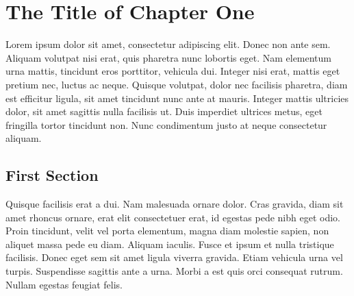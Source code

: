 \chapter{The Title of Chapter One}

Lorem ipsum dolor sit amet, consectetur adipiscing elit. Donec non ante sem. Aliquam volutpat nisi erat, quis pharetra nunc lobortis eget. Nam elementum urna mattis, tincidunt eros porttitor, vehicula dui. Integer nisi erat, mattis eget pretium nec, luctus ac neque. Quisque volutpat, dolor nec facilisis pharetra, diam est efficitur ligula, sit amet tincidunt nunc ante at mauris. Integer mattis ultricies dolor, sit amet sagittis nulla facilisis ut. Duis imperdiet ultrices metus, eget fringilla tortor tincidunt non. Nunc condimentum justo at neque consectetur aliquam.



\section{First Section}
Quisque facilisis erat a dui. Nam malesuada ornare dolor. Cras gravida, diam sit amet rhoncus ornare, erat elit consectetuer erat, id egestas pede nibh eget odio. Proin tincidunt, velit vel porta elementum, magna diam molestie sapien, non aliquet massa pede eu diam. Aliquam iaculis. Fusce et ipsum et nulla tristique facilisis. Donec eget sem sit amet ligula viverra gravida. Etiam vehicula urna vel turpis. Suspendisse sagittis ante a urna. Morbi a est quis orci consequat rutrum. Nullam egestas feugiat felis.

